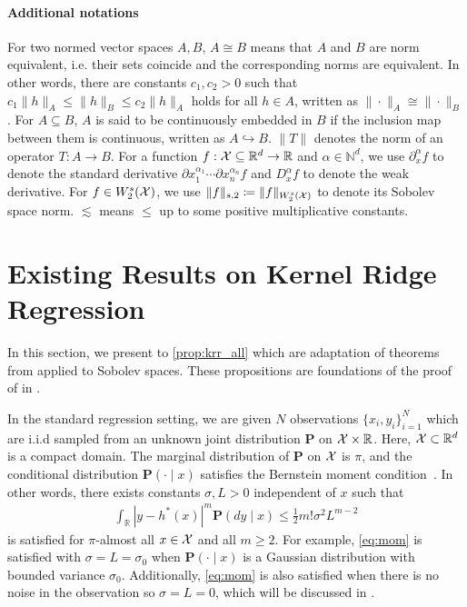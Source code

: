 \paragraph{Additional notations}
For two normed vector spaces $A, B$, $A \cong B$ means that $A$ and $B$ are norm equivalent, i.e. their sets coincide and the corresponding norms are equivalent. In other words, there are constants $c_1,c_2>0$ such that $c_1\|h\|_{A} \leq\|h\|_{B} \leq c_2\|h\|_{A}$ holds for all $h \in A$, written as $\| \cdot \|_A \cong \| \cdot \|_B$.
For $A \subseteq B$, $A$ is said to be continuously embedded in $B$ if the inclusion map between them is continuous, written as $A \hookrightarrow B$.
$\|T \|$  denotes the norm of an operator $T: A\to B$.
For a function $f:\mathcal{X} \subseteq \mathbb{R}^d \to \mathbb{R}$ and $\alpha \in \mathbb{N}^d$, we use $\partial_x^\alpha f$ to denote the standard derivative $\partial x_1^{\alpha_1} \cdots \partial x_n^{\alpha_n} f$ and $D_x^\alpha f$ to denote the weak derivative.
For $f\in W_2^s(\mathcal{X})$, we use $\|f\|_{s,2} \coloneq \|f\|_{W_2^s(\mathcal{X})}$ to denote its Sobolev space norm.
$\lesssim$ means $\leq$ up to some positive multiplicative constants. 


\section{Existing Results on Kernel Ridge Regression}

In this section, we present  to \ref{prop:krr_all} which are adaptation of theorems from \citet{fischer2020sobolev} applied to Sobolev spaces. These propositions are foundations of the proof of  in .

In the standard regression setting, we are given $N$ observations $\{x_i, y_i\}_{i=1}^N$ which are i.i.d sampled from an unknown joint distribution $\mathbf{P}$ on $\mathcal{X} \times \mathbb{R}$.
Here, $\mathcal{X} \subset \mathbb{R}^d$ is a compact domain. 
The marginal distribution of $\mathbf{P}$ on $\mathcal{X}$ is $\pi$, and the conditional distribution $\mathbf{P}(\cdot \mid x)$ satisfies the Bernstein moment condition~\citep{fischer2020sobolev}. In other words, there exists constants $\sigma, L > 0$ independent of $x$ such that
\begin{align}\label{eq:mom}
    \int_{\mathbb{R}} \left|y -h^*(x)\right|^m \mathbf{P}(d y \mid x) \leq \frac{1}{2} m!\sigma^2 L^{m-2}
\end{align}
is satisfied for $\pi$-almost all $x \in \mathcal{X}$ and all $m \geq 2$. For example,  \eqref{eq:mom} is satisfied with $\sigma=L=\sigma_0$ when $\mathbf{P}(\cdot \mid x)$ is a Gaussian distribution with bounded variance $\sigma_0$. 
Additionally, \eqref{eq:mom} is also satisfied when there is no noise in the observation so $\sigma=L=0$, which will be discussed in .

